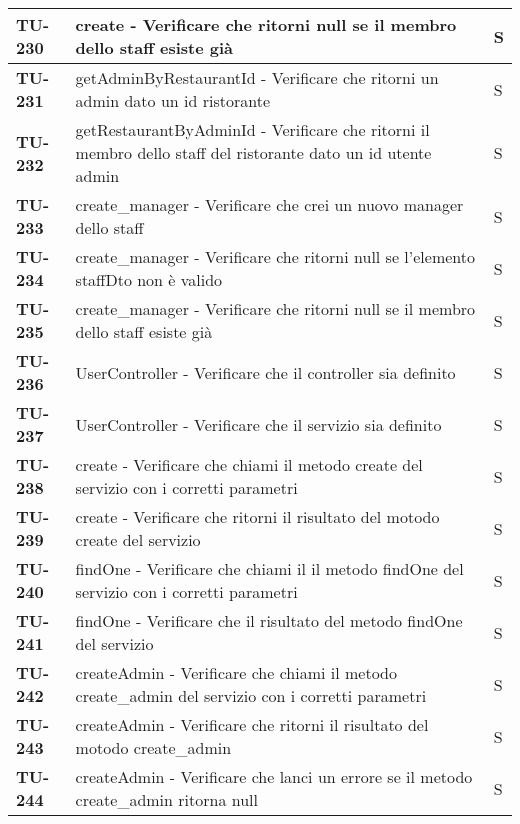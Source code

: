 \begin{longtable}{|>{\centering\arraybackslash}p{2cm}|p{15cm}|p{1cm}|}
  \hline
  \rowcolor{gray!10}
  \textbf{TU-230} & create - Verificare che ritorni null se il membro dello staff esiste già  & S \\ 
  \hline
  \rowcolor{gray!10}
  \textbf{TU-231} & getAdminByRestaurantId - Verificare che ritorni un admin dato un id ristorante  & S \\ 
  \hline
  \rowcolor{gray!10}
  \textbf{TU-232} & getRestaurantByAdminId - Verificare che ritorni il membro dello staff del ristorante dato un id utente admin  & S \\ 
  \hline
  \rowcolor{gray!10}
  \textbf{TU-233} & create\_manager - Verificare che crei un nuovo manager dello staff  & S \\ 
  \hline
  \rowcolor{gray!10}
  \textbf{TU-234} & create\_manager - Verificare che ritorni null se l'elemento staffDto non è valido  & S \\ 
  \hline
  \rowcolor{gray!10}
  \textbf{TU-235} & create\_manager - Verificare che ritorni null se il membro dello staff esiste già & S \\ 
  \hline
  \rowcolor{gray!10}
  \textbf{TU-236} & UserController - Verificare che il controller sia definito & S \\ 
  \hline
  \rowcolor{gray!10}
  \textbf{TU-237} & UserController - Verificare che il servizio sia definito & S \\ 
  \hline
  \rowcolor{gray!10}
  \textbf{TU-238} & create - Verificare che chiami il metodo create del servizio con i corretti parametri & S \\ 
  \hline
  \rowcolor{gray!10}
  \textbf{TU-239} & create - Verificare che ritorni il risultato del motodo create del servizio & S \\ 
  \hline
  \rowcolor{gray!10}
  \textbf{TU-240} & findOne - Verificare che chiami il il metodo findOne del servizio con i corretti parametri & S \\ 
  \hline
  \rowcolor{gray!10}
  \textbf{TU-241} & findOne - Verificare che il risultato del metodo findOne del servizio & S \\ 
  \hline
  \rowcolor{gray!10}
  \textbf{TU-242} & createAdmin - Verificare che chiami il metodo create\_admin del servizio con i corretti parametri & S \\ 
  \hline
  \rowcolor{gray!10}
  \textbf{TU-243} & createAdmin - Verificare che ritorni il risultato del motodo create\_admin & S \\ 
  \hline
  \rowcolor{gray!10}
  \textbf{TU-244} & createAdmin - Verificare che lanci un errore se il metodo create\_admin ritorna null  & S \\ 

\end{longtable}
